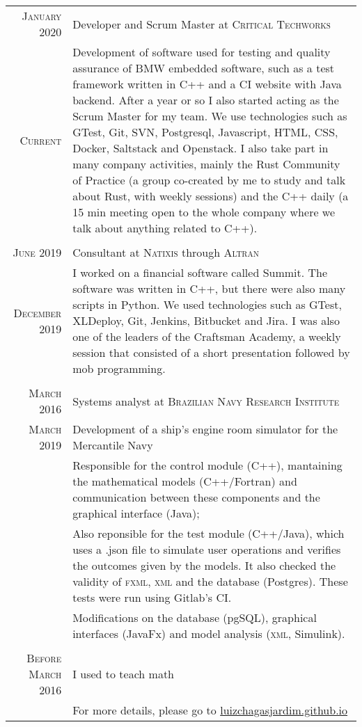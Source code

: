 \documentclass[a4paper,10pt]{article}
\begin{document}
\begin{tabular}{r|p{11cm}}

\textsc{January 2020} & Developer and Scrum Master at \textsc{Critical Techworks}\\
\textsc{Current} & Development of software used for testing and quality assurance of BMW embedded software, such as a test framework written in C++ and a CI website with Java backend. After a year or so I also started acting as the Scrum Master for my team. We use technologies such as GTest, Git, SVN, Postgresql, Javascript, HTML, CSS, Docker, Saltstack and Openstack. I also take part in many company activities, mainly the Rust Community of Practice (a group co-created by me to study and talk about Rust, with weekly sessions) and the C++ daily (a 15 min meeting open to the whole company where we talk about anything related to C++).\\

\multicolumn{2}{c}{}\\


\textsc{June 2019} & Consultant at \textsc{Natixis} through \textsc{Altran}\\
\textsc{December 2019} & I worked on a financial software called Summit. The software was written in C++, but there were also many scripts in Python. We used technologies such as GTest, XLDeploy, Git, Jenkins, Bitbucket and Jira. I was also one of the leaders of the Craftsman Academy, a weekly session that consisted of a short presentation followed by mob programming.\\

\multicolumn{2}{c}{}\\

\textsc{March 2016} & Systems analyst at \textsc{Brazilian Navy Research Institute}\\
\textsc{March 2019} & Development of a ship's engine room simulator for the Mercantile Navy\\&
\footnotesize{Responsible for the control module (C++), mantaining the mathematical models (C++/Fortran) and communication between these components and the graphical interface (Java);}\\&
\footnotesize{Also reponsible for the test module (C++/Java), which uses a .json file to simulate user operations and verifies the outcomes given by the models. It also checked the validity of \textsc{fxml}, \textsc{xml} and the database (Postgres). These tests were run using Gitlab's CI.}\\&
\footnotesize{Modifications on the database (pgSQL), graphical interfaces (JavaFx) and model analysis (\textsc{xml}, Simulink).}\\

\multicolumn{2}{c}{}\\

\textsc{Before March 2016} & I used to teach math\\
& \footnotesize{For more details, please go to \href{http://luizchagasjardim.github.io}{luizchagasjardim.github.io}}
\end{tabular}
\end{document}
